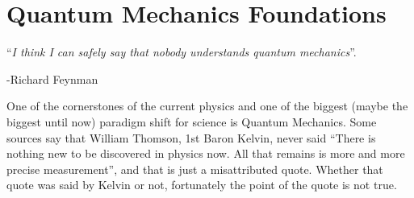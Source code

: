 %
%
%
%
%


\section{Quantum Mechanics Foundations}

\begin{flushright}
{\small
``{\em I think I can safely say that nobody
understands quantum mechanics}''.

-Richard Feynman
}
\end{flushright}

\normalsize One of the cornerstones of the current physics and one of the
biggest (maybe the biggest until now) paradigm shift for science is Quantum
Mechanics.  Some sources say that William Thomson, 1st Baron
Kelvin, never said ``There is nothing new to be discovered in physics now. All
that remains is more and more precise measurement'', and that is just a
misattributed quote.  Whether that quote was said by Kelvin or not, fortunately
the point of the quote is not true.


